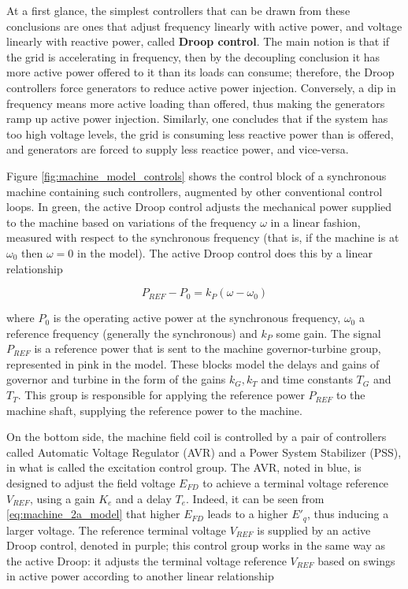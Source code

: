 	At a first glance, the simplest controllers that can be drawn from these conclusions are ones that adjust frequency linearly with active power, and voltage linearly with reactive power, called \textbf{Droop control}. The main notion is that if the grid is accelerating in frequency, then by the decoupling conclusion it has more active power offered to it than its loads can consume; therefore, the Droop controllers force generators to reduce active power injection. Conversely, a dip in frequency means more active loading than offered, thus making the generators ramp up active power injection. Similarly, one concludes that if the system has too high voltage levels, the grid is consuming less reactive power than is offered, and generators are forced to supply less reactice power, and vice-versa.

	Figure \ref{fig:machine_model_controls} shows the control block of a synchronous machine containing such controllers, augmented by other conventional control loops. In {\color{stewartgreen} green}, the active Droop control adjusts the mechanical power supplied to the machine based on variations of the frequency $\omega$ in a linear fashion, measured with respect to the synchronous frequency (that is, if the machine is at $\omega_0$ then $\omega = 0$ in the model). The active Droop control does this by a linear relationship

\begin{equation} P_{REF} - P_0 = k_P\left(\omega - \omega_0\right) \end{equation}

	\noindent where $P_{0}$ is the operating active power at the synchronous frequency, $\omega_0$ a reference frequency (generally the synchronous) and $k_P$ some gain. The signal $P_{REF}$ is a reference power that is sent to the machine governor-turbine group, represented in {\color{stewartpink} pink} in the model. These blocks model the delays and gains of governor and turbine in the form of the gains $k_G,k_T$ and time constants $T_G$ and $T_T$. This group is responsible for applying the reference power $P_{REF}$ to the machine shaft, supplying the reference power to the machine.

	On the bottom side, the machine field coil is controlled by a pair of controllers called Automatic Voltage Regulator (AVR) and a Power System Stabilizer (PSS), in what is called the excitation control group. The AVR, noted in {\color{stewartblue} blue}, is designed to adjust the field voltage $E_{FD}$ to achieve a terminal voltage reference $V_{REF}$, using a gain $K_e$ and a delay $T_e$. Indeed, it can be seen from \eqref{eq:machine_2a_model} that higher $E_{FD}$ leads to a higher $E'_q$, thus inducing a larger voltage. The reference terminal voltage $V_{REF}$ is supplied by an active Droop control, denoted in {\color{stewartpurple} purple}; this control group works in the same way as the active Droop: it adjusts the terminal voltage reference $V_{REF}$ based on swings in active power according to another linear relationship

